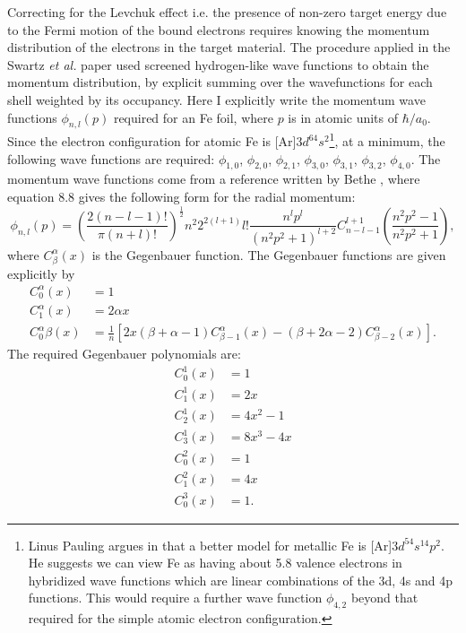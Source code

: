 \documentclass[12pt]{article}
\begin{document}
\maketitle
Correcting for the Levchuk effect i.e. the presence of non-zero target energy due to the Fermi motion of the bound electrons requires knowing the momentum distribution of the electrons in the target material. The procedure applied in the Swartz {\it et al.} paper \cite{Swartz1995} used screened hydrogen-like wave functions to obtain the momentum distribution, by explicit summing over the wavefunctions for each shell weighted by its occupancy. Here I explicitly write the momentum wave functions $\phi_{n,l}(p)$ required for an Fe foil, where $p$ is in atomic units of $\hbar/a_0$. Since the electron configuration for atomic Fe is [Ar]$3d^64s^2$\footnote{Linus Pauling argues in \cite{Pauling1953} that a better model for metallic Fe is [Ar]$3d^54s^14p^2$. He suggests we can view Fe as having about 5.8 valence electrons in hybridized wave functions which are linear combinations of the 3d, 4s and 4p functions. This would require a further wave function $\phi_{4,2}$ beyond that required for the simple atomic electron configuration.}, at a minimum, the following wave functions are required: $\phi_{1,0}$, $\phi_{2,0}$, $\phi_{2,1}$, $\phi_{3,0}$, $\phi_{3,1}$, $\phi_{3,2}$, $\phi_{4,0}$. The momentum wave functions come from a reference written by Bethe \cite{Bethe1957}, where equation 8.8 gives the following form for the radial momentum:
\begin{equation}
\phi_{n,l}(p)=\left(\frac{2(n-l-1)!}{\pi(n+l)!}\right)^{\frac{1}{2}}n^2 2^{2(l+1)}l!\frac{n^lp^l}{(n^2p^2+1)^{l+2}}C^{l+1}_{n-l-1}\left(\frac{n^2p^2-1}{n^2p^2+1}\right),
\label{eq:phi_nl}
\end{equation}
where $C_\beta^\alpha(x)$ is the Gegenbauer function. The Gegenbauer functions are given explicitly by
\begin{align*}
C^\alpha_0(x)&=1\\
C^\alpha_1(x)&=2\alpha x\\
C^\alpha_0\beta(x)&=\frac{1}{n}\left[2x(\beta+\alpha-1)C^\alpha_{\beta-1}(x)-(\beta+2\alpha-2)C^\alpha_{\beta-2}(x)\right].
\end{align*}
The required Gegenbauer polynomials are:
\begin{align*}
C^1_0(x)&=1\\
C^1_1(x)&=2x\\
C^1_2(x)&=4x^2-1\\
C^1_3(x)&=8x^3-4x\\
C^2_0(x)&=1\\
C^2_1(x)&=4x\\
C^3_0(x)&=1.
\end{align*}
\end{document}
